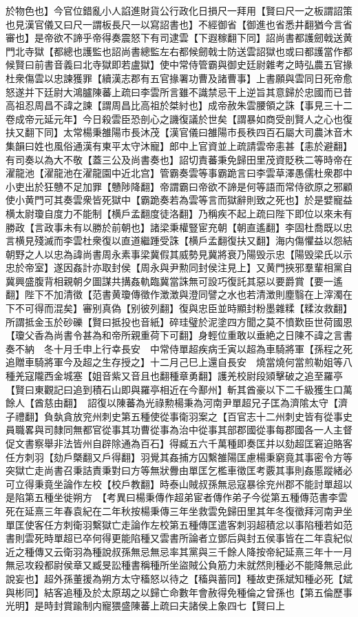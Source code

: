 於物色也】今官位錯亂小人諂進財貨公行政化日損尺一拜用【賢曰尺一之板謂詔策也見漢官儀又曰尺一謂板長尺一以寫詔書也】不經御省【御進也省悉井翻猶今言省審也】是帝欲不諦乎帝得奏震怒下有司逮雲【下遐稼翻下同】詔尚書都護劒戟送黄門北寺獄【都總也護監也詔尚書總監左右都候劒戟士防送雲詔獄也或曰都護當作都候賢曰前書音義曰北寺獄即若盧獄】使中常侍管霸與御史廷尉雜考之時弘農五官掾杜衆傷雲以忠諫獲罪【續漢志郡有五官掾署功曹及諸曹事】上書願與雲同日死帝愈怒遂并下廷尉大鴻臚陳蕃上疏曰李雲所言雖不識禁忌干上逆旨其意歸於忠國而已昔高祖忍周昌不諱之諫【謂周昌比高祖於桀紂也】成帝赦朱雲腰領之誅【事見三十二卷成帝元延元年】今日殺雲臣恐剖心之譏復議於世矣【謂暴如商受剖賢人之心也復扶又翻下同】太常楊秉雒陽市長沐茂【漢官儀曰雒陽市長秩四百石屬大司農沐音木集韻曰姓也風俗通漢有東平太守沐寵】郎中上官資並上疏請雲帝恚甚【恚於避翻】有司奏以為大不敬【蓋三公及尚書奏也】詔切責蕃秉免歸田里茂資貶秩二等時帝在濯龍池【濯龍池在濯龍園中近北宫】管霸奏雲等事霸跪言曰李雲草澤愚儒杜衆郡中小吏出於狂戇不足加罪【戇陟降翻】帝謂霸曰帝欲不諦是何等語而常侍欲原之邪顧使小黄門可其奏雲衆皆死獄中【霸跪奏若為雲等言而獄辭則致之死也】於是嬖寵益横太尉瓊自度力不能制【横戶孟翻度徒洛翻】乃稱疾不起上疏曰陛下即位以來未有勝政【言政事未有以勝於前朝也】諸梁秉權豎宦充朝【朝直遙翻】李固杜喬既以忠言横見殘滅而李雲杜衆復以直道繼踵受誅【横戶孟翻復扶又翻】海内傷懼益以怨結朝野之人以忠為諱尚書周永素事梁冀假其威勢見冀將衰乃陽毁示忠【陽毁梁氏以示忠於帝室】遂因姦計亦取封侯【周永與尹勲同封侯注見上】又黄門挾邪羣輩相黨自冀興盛腹背相親朝夕圖謀共搆姦軌臨冀當誅無可設巧復託其惡以要爵賞【要一遙翻】陛下不加清徵【范書黄瓊傳徵作澂澂與澄同譬之水也若清澂則塵翳在上滓濁在下不可得而混矣】審别真偽【别彼列翻】復與忠臣並時顯封粉墨雜糅【糅汝救翻】所謂抵金玉於砂礫【賢曰抵投也音紙】碎珪璧於泥塗四方聞之莫不憤歎臣世荷國恩【瓊父香為尚書令甚為和帝所親重荷下可翻】身輕位重敢以垂絶之日陳不諱之言書奏不納　冬十月壬申上行幸長安　中常侍單超疾病壬寅以超為車騎將軍【孫程之死追贈車騎將軍今及超之生存授之】十二月己巳上還自長安　燒當燒何當煎勒姐等八種羌寇隴西金城塞【姐音紫又音且也翻種章勇翻】護羌校尉段熲擊破之追至羅亭【賢曰東觀記曰追到積石山即與羅亭相近在今鄯州】斬其酋豪以下二千級獲生口萬餘人【酋慈由翻】　詔復以陳蕃為光祿勲楊秉為河南尹單超兄子匡為濟隂太守【濟子禮翻】負埶貪放兖州刺史第五種使從事衛羽案之【百官志十二州刺史皆有從事史員職畧與司隸同無都官從事其功曹從事為治中從事其部郡國從事每郡國各一人主督促文書察舉非法皆州自辟除通為百石】得臧五六千萬種即奏匡并以劾超匡窘迫賂客任方刺羽【劾戶槩翻又戶得翻】羽覺其姦捕方囚繫雒陽匡慮楊秉窮竟其事密令方等突獄亡走尚書召秉詰責秉對曰方等無狀釁由單匡乞檻車徵匡考覈其事則姦慝蹤緒必可立得秉竟坐論作左校【校戶教翻】時泰山賊叔孫無忌寇暴徐兖州郡不能討單超以是陷第五種坐徙朔方　【考異曰楊秉傳作超弟宦者傳作弟子今從第五種傳范書李雲死在延熹三年春袁紀在二年秋按楊秉傳三年坐救雲免歸田里其年冬復徵拜河南尹坐單匡使客任方刺衛羽繫獄亡走論作左校第五種傳匡遣客刺羽超積忿以事陷種若如范書則雲死時單超已卒何得更能陷種又雲書所論者立鄧后與封五侯事皆在二年袁紀似近之種傳又云衛羽為種說叔孫無忌無忌率其黨與三千餘人降按帝紀延熹三年十一月無忌攻殺都尉侯章又臧旻訟種書稱種所坐盜賊公負筋力未就然則種必不能降無忌此說妄也】超外孫董援為朔方太守稸怒以待之【稸與蓄同】種故吏孫斌知種必死【斌與彬同】結客追種及於太原刼之以歸亡命數年會赦得免種倫之曾孫也【第五倫歷事光明】是時封賞踰制内寵猥盛陳蕃上疏曰夫諸侯上象四七【賢曰上